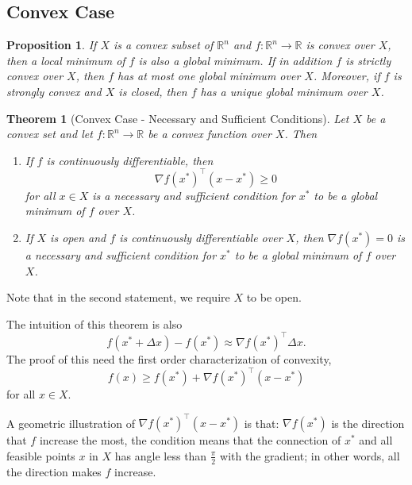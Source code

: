 \documentclass[12pt,a4paper]{report}
\numberwithin{equation}{section}
\theoremstyle{mystyle}
\newtheorem{theorem}[definition]{Theorem}
\newtheorem{proposition}[definition]{Proposition}
\newcommand{\R}{\mathbb{R}}
\newcommand{\grad}{\nabla}
\newcommand{\T}{\top}
\begin{document}
	\subsection{Convex Case}
	\begin{proposition}
		If $X$ is a convex subset of $\R^n$ and $f:\R^n \to \R$ is convex over $X$, then a local minimum of $f$ is also a global minimum. If in addition $f$ is strictly convex over $X$, then $f$ has at most one global minimum over $X$. Moreover, if $f$ is strongly convex and $X$ is closed, then $f$ has a unique global minimum over $X$.
	\end{proposition}
	
	\begin{theorem}[Convex Case - Necessary and Sufficient Conditions]
		Let $X$ be a convex set and let $f:\R^n \to \R$ be a convex function over $X$. Then
		\begin{enumerate}
			\item If $f$ is continuously differentiable, then
			$$
			\grad f(x^*)^\T(x-x^*)\geq 0
			$$
			for all $x\in X$ is a necessary and sufficient condition for $x^*$ to be a global minimum of $f$ over $X$.
			\item If $X$ is open and $f$ is continuously differentiable over $X$, then $\grad f(x^*)=0$ is a necessary and sufficient condition for $x^*$ to be a global minimum of $f$ over $X$.
		\end{enumerate}
	\end{theorem}
	Note that in the second statement, we require $X$ to be open.

	The intuition of this theorem is also
	$$
	f(x^*+\Delta x)-f(x^*)\approx \grad f(x^*)^\T \Delta x.
	$$
	The proof of this need the first order characterization of convexity,
	$$
	f(x)\geq f(x^*) +\grad f(x^*)^\T (x-x^*)
	$$
	for all $x\in X$.
	
	A geometric illustration of $\grad f(x^*)^\T(x-x^*)$ is that: $\grad f(x^*)$ is the direction that $f$ increase the most, the condition means that the connection of $x^*$ and all feasible points $x$ in $X$ has angle less than $\frac{\pi}{2}$ with the gradient; in other words, all the direction makes $f$ increase.
	
\end{document}
